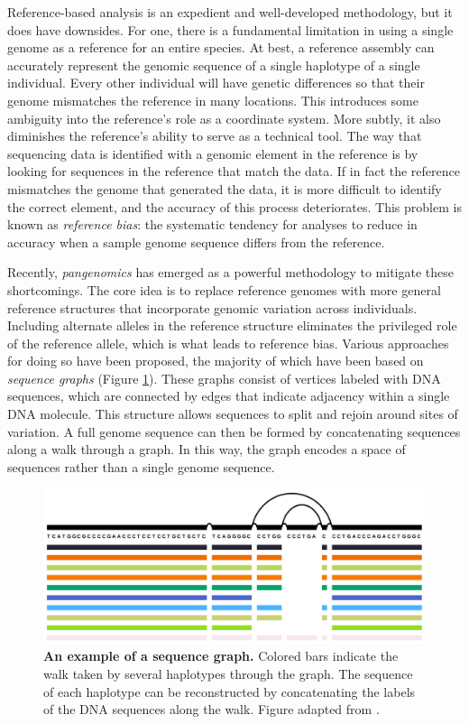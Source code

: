 \documentclass[11pt]{ucthesis}
\begin{document}
Reference-based analysis is an expedient and well-developed methodology, but it does have downsides. For one, there is a fundamental limitation in using a single genome as a reference for an entire species. At best, a reference assembly can accurately represent the genomic sequence of a single haplotype of a single individual. Every other individual will have genetic differences so that their genome mismatches the reference in many locations. This introduces some ambiguity into the reference's role as a coordinate system. More subtly, it also diminishes the reference's ability to serve as a technical tool. The way that sequencing data is identified with a genomic element in the reference is by looking for sequences in the reference that match the data. If in fact the reference mismatches the genome that generated the data, it is more difficult to identify the correct element, and the accuracy of this process deteriorates. This problem is known as \emph{reference bias}: the systematic tendency for analyses to reduce in accuracy when a sample genome sequence differs from the reference. 

Recently, \emph{pangenomics} has emerged as a powerful methodology to mitigate these shortcomings. The core idea is to replace reference genomes with more general reference structures that incorporate genomic variation across individuals. Including alternate alleles in the reference structure eliminates the privileged role of the reference allele, which is what leads to reference bias. Various approaches for doing so have been proposed, the majority of which have been based on \emph{sequence graphs} (Figure \ref{fig:graph_example}). These graphs consist of vertices labeled with DNA sequences, which are connected by edges that indicate adjacency within a single DNA molecule. This structure allows sequences to split and rejoin around sites of variation. A full genome sequence can then be formed by concatenating sequences along a walk through a graph. In this way, the graph encodes a space of sequences rather than a single genome sequence.

\begin{figure}[h]
\begin{center}
\includegraphics[width=.75\textwidth]{introfigures/pangenome_graph.png}
\caption{\textbf{An example of a sequence graph.} Colored bars indicate the walk taken by several haplotypes through the graph. The sequence of each haplotype can be reconstructed by concatenating the labels of the DNA sequences along the walk. Figure adapted from \cite{Garrison_2019}.
} \label{fig:graph_example}
\end{center}
\end{figure}
\end{document}
